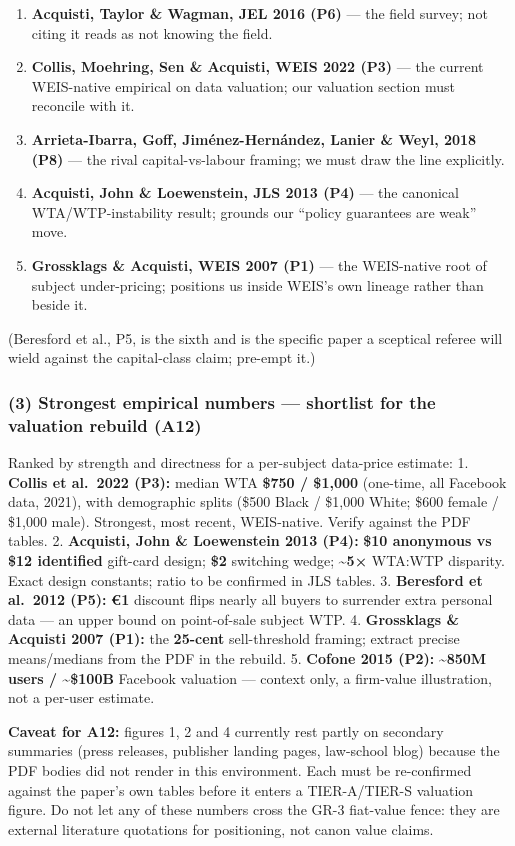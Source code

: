\documentclass[
  11pt,
]{article}
\providecommand{\tightlist}{%
  \setlength{\itemsep}{0pt}\setlength{\parskip}{0pt}}
\begin{document}
\begin{enumerate}
\def\labelenumi{\arabic{enumi}.}
\tightlist
\item
  \textbf{Acquisti, Taylor \& Wagman, JEL 2016 (P6)} --- the field
  survey; not citing it reads as not knowing the field.
\item
  \textbf{Collis, Moehring, Sen \& Acquisti, WEIS 2022 (P3)} --- the
  current WEIS-native empirical on data valuation; our valuation section
  must reconcile with it.
\item
  \textbf{Arrieta-Ibarra, Goff, Jiménez-Hernández, Lanier \& Weyl, 2018
  (P8)} --- the rival capital-vs-labour framing; we must draw the line
  explicitly.
\item
  \textbf{Acquisti, John \& Loewenstein, JLS 2013 (P4)} --- the
  canonical WTA/WTP-instability result; grounds our ``policy guarantees
  are weak'' move.
\item
  \textbf{Grossklags \& Acquisti, WEIS 2007 (P1)} --- the WEIS-native
  root of subject under-pricing; positions us inside WEIS's own lineage
  rather than beside it.
\end{enumerate}

(Beresford et al., P5, is the sixth and is the specific paper a
sceptical referee will wield against the capital-class claim; pre-empt
it.)

\subsubsection{(3) Strongest empirical numbers --- shortlist for the
valuation rebuild
(A12)}\label{strongest-empirical-numbers-shortlist-for-the-valuation-rebuild-a12}

Ranked by strength and directness for a per-subject data-price estimate:
1. \textbf{Collis et al.~2022 (P3):} median WTA \textbf{\$750 / \$1,000}
(one-time, all Facebook data, 2021), with demographic splits (\$500
Black / \$1,000 White; \$600 female / \$1,000 male). Strongest, most
recent, WEIS-native. Verify against the PDF tables. 2. \textbf{Acquisti,
John \& Loewenstein 2013 (P4):} \textbf{\$10 anonymous vs \$12
identified} gift-card design; \textbf{\$2} switching wedge;
\textasciitilde{}\textbf{5×} WTA:WTP disparity. Exact design constants;
ratio to be confirmed in JLS tables. 3. \textbf{Beresford et al.~2012
(P5):} \textbf{€1} discount flips nearly all buyers to surrender extra
personal data --- an upper bound on point-of-sale subject WTP. 4.
\textbf{Grossklags \& Acquisti 2007 (P1):} the \textbf{25-cent}
sell-threshold framing; extract precise means/medians from the PDF in
the rebuild. 5. \textbf{Cofone 2015 (P2):} \textasciitilde{}\textbf{850M
users / \textasciitilde\$100B} Facebook valuation --- context only, a
firm-value illustration, not a per-user estimate.

\textbf{Caveat for A12:} figures 1, 2 and 4 currently rest partly on
secondary summaries (press releases, publisher landing pages, law-school
blog) because the PDF bodies did not render in this environment. Each
must be re-confirmed against the paper's own tables before it enters a
TIER-A/TIER-S valuation figure. Do not let any of these numbers cross
the GR-3 fiat-value fence: they are external literature quotations for
positioning, not canon value claims.
\end{document}
